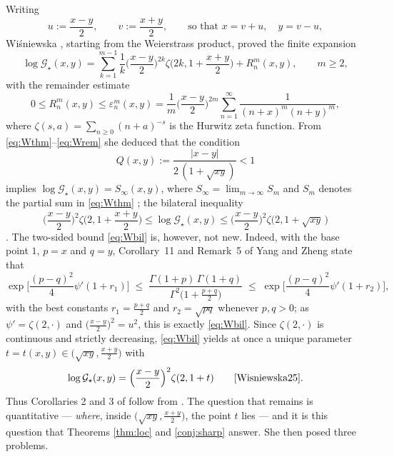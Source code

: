 \documentclass[11pt,a4paper]{amsart}
\theoremstyle{definition}
\newcommand{\Gs}{\mathcal{G}_{\star}}
\newcommand{\eps}{\varepsilon}
\begin{document}
Writing
\begin{equation}\label{eq:uv}
  u:=\frac{x-y}{2},\qquad v:=\frac{x+y}{2},\qquad\text{so that }x=v+u,\quad y=v-u,
\end{equation}
Wi\'sniewska \cite[Thm.~1]{Wisniewska25}, starting from the Weierstrass product, proved the
finite expansion
\begin{equation}\label{eq:Wthm}
  \log\Gs(x,y)=\sum_{k=1}^{m-1}\frac{1}{k}\Big(\frac{x-y}{2}\Big)^{2k}
     \zeta\Big(2k,1+\frac{x+y}{2}\Big)+R^{m}_{n}(x,y),\qquad m\ge2,
\end{equation}
with the remainder estimate
\begin{equation}\label{eq:Wrem}
  0\le R^{m}_{n}(x,y)\le \eps^{m}_{n}(x,y)
  =\frac1m\Big(\frac{x-y}{2}\Big)^{2m}\sum_{n=1}^{\infty}\frac{1}{(n+x)^{m}(n+y)^{m}},
\end{equation}
where $\zeta(s,a)=\sum_{n\ge0}(n+a)^{-s}$ is the Hurwitz zeta function. From
\eqref{eq:Wthm}--\eqref{eq:Wrem} she deduced that the condition
\begin{equation}\label{eq:Q}
  Q(x,y):=\frac{|x-y|}{2\,(1+\sqrt{xy})}<1
\end{equation}
implies $\log\Gs(x,y)=S_{\infty}(x,y)$, where $S_\infty=\lim_{m\to\infty}S_m$ and $S_m$
denotes the partial sum in \eqref{eq:Wthm} \cite[Cor.~1]{Wisniewska25}; the bilateral
inequality
\begin{equation}\label{eq:Wbil}
  \Big(\frac{x-y}{2}\Big)^{2}\zeta\Big(2,1+\frac{x+y}{2}\Big)\le\log\Gs(x,y)
  \le\Big(\frac{x-y}{2}\Big)^{2}\zeta\big(2,1+\sqrt{xy}\,\big)
\end{equation}
\cite[Cor.~2]{Wisniewska25}. The two-sided bound \eqref{eq:Wbil} is, however, not new.
Indeed, with the base point $1$, $p=x$ and $q=y$, Corollary~11 and Remark~5 of Yang and
Zheng \cite{YangZheng19} state that
\begin{equation}\label{eq:YZ}
  \exp\Big[\frac{(p-q)^{2}}{4}\psi'(1+r_{1})\Big]
  \;\le\;\frac{\Gamma(1+p)\,\Gamma(1+q)}{\Gamma^{2}\big(1+\frac{p+q}{2}\big)}
  \;\le\;\exp\Big[\frac{(p-q)^{2}}{4}\psi'(1+r_{2})\Big],
\end{equation}
with the best constants $r_{1}=\frac{p+q}{2}$ and $r_{2}=\sqrt{pq}$ whenever $p,q>0$; as
$\psi'=\zeta(2,\cdot)$ and $\big(\frac{x-y}{2}\big)^{2}=u^{2}$, this is exactly
\eqref{eq:Wbil}. Since $\zeta(2,\cdot)$ is continuous and strictly decreasing,
\eqref{eq:Wbil} yields at once a unique parameter
$t=t(x,y)\in\big(\sqrt{xy},\tfrac{x+y}{2}\big)$ with
\begin{equation}\label{eq:Wt}
  \log\Gs(x,y)=\Big(\frac{x-y}{2}\Big)^{2}\zeta(2,1+t)
  \qquad\text{\cite[Cor.~3]{Wisniewska25}.}
\end{equation}
Thus Corollaries 2 and 3 of \cite{Wisniewska25} follow from \cite{YangZheng19}. The
question that remains is quantitative --- \emph{where}, inside
$\big(\sqrt{xy},\frac{x+y}{2}\big)$, the point $t$ lies --- and it is this question that
Theorems \ref{thm:loc} and \ref{conj:sharp} answer.
She then posed \cite[\S2]{Wisniewska25} three problems.
\end{document}
